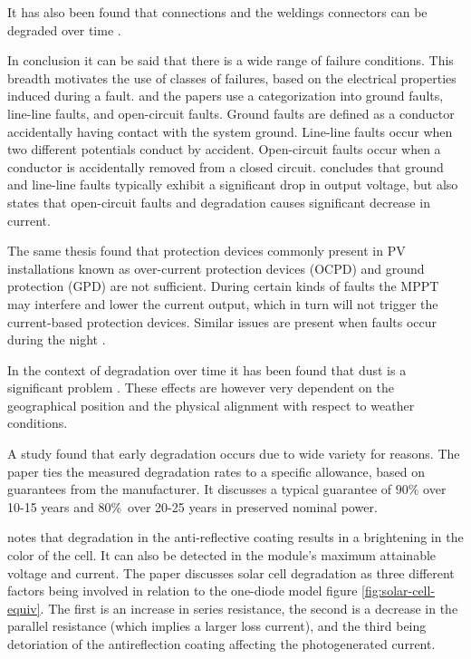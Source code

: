 It has also been found that connections and the weldings connectors can be degraded over time \cite{Houssein2010}.

In conclusion it can be said that there is a wide range of failure conditions.
This breadth motivates the use of classes of failures, based on the electrical properties induced during a fault.
\cite{Zhao2010thesis} and the papers \cite{Zhao2012tree,Zhao2013graph,Zhao2013outlier} use a categorization into ground faults, line-line faults, and open-circuit faults.
Ground faults are defined as a conductor accidentally having contact with the system ground\cite{Zhao2010thesis}.
Line-line faults occur when two different potentials conduct by accident\cite{Zhao2010thesis}.
Open-circuit faults occur when a conductor is accidentally removed from a closed circuit\cite{Zhao2010thesis}.
\cite{Zhao2010thesis} concludes that ground and line-line faults typically exhibit a significant drop in output voltage,
but also states that open-circuit faults and degradation causes significant decrease in current.

The same thesis found that protection devices commonly present in PV installations known as over-current protection devices (OCPD) and ground protection (GPD) are not sufficient.
During certain kinds of faults the MPPT may interfere and lower the current output, which in turn will not trigger the current-based protection devices.
Similar issues are present when faults occur during the night \cite{Zhao2010night}.

In the context of degradation over time it has been found that dust is a significant problem \cite{Mani2010}.
These effects are however very dependent on the geographical position and the physical alignment with respect to weather conditions.

A study \cite{Munoz2011} found that early degradation occurs due to wide variety for reasons.
The paper ties the measured degradation rates to a specific allowance, based on guarantees from the manufacturer.
It discusses a typical guarantee of $90\%$ over 10-15 years and $80\%$ over 20-25 years in preserved nominal power.

\cite{Meyer2004} notes that degradation in the anti-reflective coating results in a brightening in the color of the cell.
It can also be detected in the module's maximum attainable voltage and current.
The paper discusses solar cell degradation as three different factors being involved in relation to the one-diode model figure \ref{fig:solar-cell-equiv}.
The first is an increase in series resistance, the second is a decrease in the parallel resistance (which implies a larger loss current), and the third being detoriation of the antireflection coating affecting the photogenerated current.

